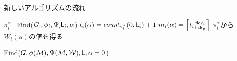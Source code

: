 \documentclass[ 10pt]{jsarticle}
\newcommand{\tick}{{\sf tick}}
\newcommand{\Len}{{\sf L}}
\begin{document}
\begin{algorithm}
\caption{新しいアルゴリズムの流れ} \label{alg1}
\begin{algorithmic}
%


	
	
		\State $\pi_i^\alpha$=Find($G_i,\phi_i,\Psi_,\Len_i,\alpha$)
		\State $t_i(\alpha)=\textit{count}_{\pi_i^\alpha}(0,\Len_i)+1$
		\State $m_i(\alpha)=\left\lceil t_i\frac{\tick_i}{\tick_p} \right\rceil $
		\State $\pi_i^\alpha$から$W_i(\alpha)$の値を得る 
		
	\EndFor
\EndFor
\State Find($G,\phi(\mathcal{M}),\Psi(\mathcal{M},\mathcal{W}),\Len,\alpha=0$)
\end{algorithmic}
\end{algorithm}
%
%
\begin{comment}
%
\begin{enumerate}
\item
すべての$i\in\{1,\ldots,M\}$について、
\begin{enumerate}
\item\label{1-a}
下位TDES $G_i$のHard制約$\phi_i$を満たす実行列（execution）$\pi_i$を求める。
\item\label{1-b}
$\pi_i$から$\phi_i$を満たすのにかかった時間を求め、$t_i$とする
\end{enumerate}
\item\label{2}
それぞれの$i$について、$m_i=\left\lceil t_i\frac{\tick_i}{\tick_p} \right\rceil = \left\lceil \frac{t_i}{K_i}\right\rceil $を求める（$K_i$は提出した論文の式15で導入）
\item
$G$の仕様に$\bm{m}$の値を代入
\item
$G$の動作計画を行う
\end{enumerate}
%
%
%
\end{comment}
%
%
\end{document}
